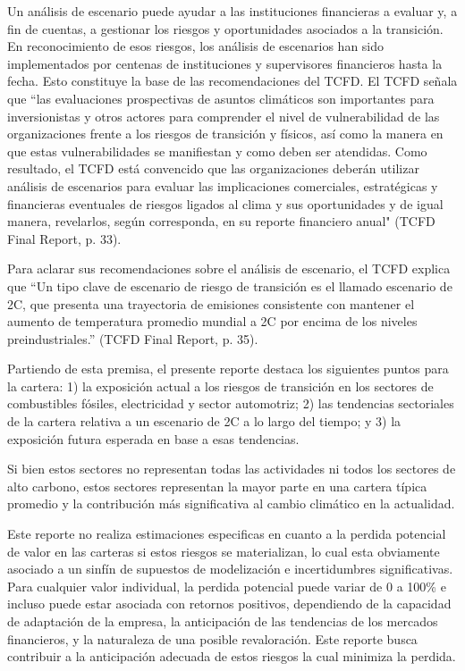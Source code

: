 \documentclass[10pt,table]{article}\usepackage[]{graphicx}\usepackage[]{color}
\begin{document}
\begin{multicols}{2}
	Un análisis de escenario puede ayudar a las instituciones financieras a evaluar y, a fin de cuentas, a gestionar los riesgos y oportunidades asociados a la transición. En reconocimiento de esos riesgos, los análisis de escenarios han sido implementados por centenas de instituciones y supervisores financieros hasta la fecha. Esto constituye la base de las recomendaciones del TCFD. El TCFD señala que “las evaluaciones prospectivas de asuntos climáticos son importantes para inversionistas y otros actores para comprender el nivel de vulnerabilidad de las organizaciones frente a los riesgos de transición y físicos, así como la manera en que estas vulnerabilidades se manifiestan y como deben ser atendidas. Como resultado, el TCFD está convencido que las organizaciones deberán utilizar análisis de escenarios para evaluar las implicaciones comerciales, estratégicas y financieras eventuales de riesgos ligados al clima y sus oportunidades y de igual manera, revelarlos, según corresponda, en su reporte financiero anual" (TCFD Final Report, p. 33).
		
	Para aclarar sus recomendaciones sobre el análisis de escenario, el TCFD explica que “Un tipo clave de escenario de riesgo de transición es el llamado escenario de 2\degree C, que presenta una trayectoria de emisiones consistente con mantener el aumento de temperatura promedio mundial a 2\degree C por encima de los niveles preindustriales.” (TCFD Final Report, p. 35).
		
	Partiendo de esta premisa, el presente reporte destaca los siguientes puntos para la cartera: 1) la exposición actual a los riesgos de transición en los sectores de combustibles fósiles, electricidad y sector automotriz; 2) las tendencias sectoriales de la cartera relativa a un escenario de 2\degree C a lo largo del tiempo; y 3) la exposición futura esperada en base a esas tendencias. 
		
	Si bien estos sectores no representan todas las actividades ni todos los sectores de alto carbono, estos sectores representan la mayor parte en una cartera típica promedio y la contribución más significativa al cambio climático en la actualidad.
		
	Este reporte no realiza estimaciones especificas en cuanto a la perdida potencial de valor en las carteras si estos riesgos se materializan, lo cual esta obviamente asociado a un sinfín de supuestos de modelización e incertidumbres significativas. Para cualquier valor individual, la perdida potencial puede variar de 0 a 100\% e incluso puede estar asociada con retornos positivos, dependiendo de la capacidad de adaptación de la empresa, la anticipación de las tendencias de los mercados financieros, y la naturaleza de una posible revaloración. Este reporte busca contribuir a la anticipación adecuada de estos riesgos la cual minimiza la perdida.
		
	\end{multicols}
\end{document}
